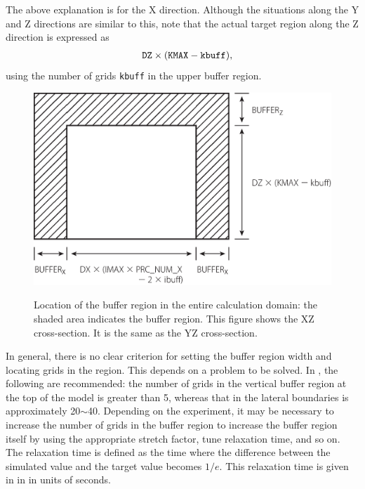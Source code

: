 The above explanation is for the X direction. Although the situations along the Y and Z directions are similar to this, note that the actual target region along the Z direction is expressed as
\begin{eqnarray}
&& \nmitemeq{DZ} \times ( \nmitemeq{KMAX} - \verb|kbuff| ),
\end{eqnarray}
using the number of grids \verb|kbuff| in the upper buffer region.

\begin{figure}[t]
\begin{center}
  \includegraphics[width=0.8\hsize]{./figure/buffer_xz.eps}\\
  \caption{Location of the buffer region in the entire calculation domain: the shaded area indicates the buffer region. This figure shows the XZ cross-section. It is the same as the YZ cross-section.}
  \label{fig:buff_xz}
\end{center}
\end{figure}


In general, there is no clear criterion for setting the buffer region width and locating grids in the region.
This depends on a problem to be solved. In \scalerm, the following are recommended: the number of grids in the vertical buffer region at the top of the model is greater than 5, whereas that in the lateral boundaries is approximately 20$\sim$40. Depending on the experiment, it may be necessary to increase the number of grids in the buffer region to increase the buffer region itself by using the appropriate stretch factor, tune relaxation time, and so on.
The relaxation time is defined as the time
where the difference between the simulated value and the target value becomes $1/e$.
This relaxation time is given in   in  in units of seconds.


